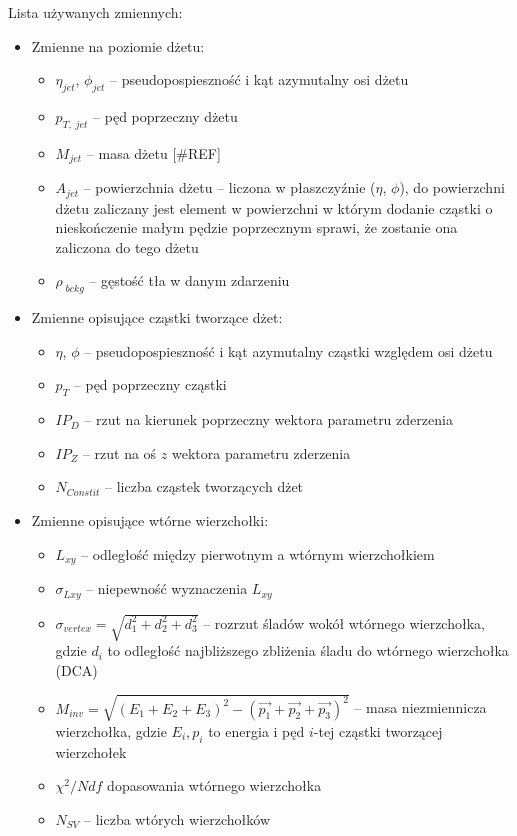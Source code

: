 Lista używanych zmiennych:
\begin{itemize}
	\item Zmienne na poziomie dżetu:
	\begin{itemize}	
		\item $\eta_{jet}$, $\phi_{jet}$ -- pseudopospieszność i kąt azymutalny osi dżetu
		\item $p_{T,\;jet}$ -- pęd poprzeczny dżetu
		\item $M_{jet}$ -- masa dżetu [\#REF]
		\item $A_{jet}$ -- powierzchnia dżetu -- liczona w płaszczyźnie ($\eta$, $\phi$),   do powierzchni dżetu zaliczany jest element w powierzchni w którym dodanie cząstki o nieskończenie małym pędzie poprzecznym sprawi, że zostanie ona zaliczona do tego dżetu \cite{Cacciari:2007fd}
		\item $\rho_{\;bckg}$ -- gęstość tła w danym zdarzeniu
	\end{itemize}
	
	\item Zmienne opisujące cząstki tworzące dżet:
	\begin{itemize}	
		\item $\eta$, $\phi$ -- pseudopospieszność i kąt azymutalny cząstki względem osi dżetu
		\item $p_T$ -- pęd poprzeczny cząstki
		\item $IP_D$ -- rzut na kierunek poprzeczny wektora parametru zderzenia
		\item $IP_Z$ -- rzut na oś $z$ wektora parametru zderzenia
		\item $N_{Constit}$ -- liczba cząstek tworzących dżet
	\end{itemize}	
	
	
	\item Zmienne opisujące wtórne wierzchołki:
	\begin{itemize}	
		\item $L_{xy}$ -- odległość między pierwotnym a wtórnym wierzchołkiem 
		\item $\sigma_{Lxy}$ -- niepewność wyznaczenia $L_{xy}$
		\item $\sigma_{vertex} = \sqrt{d_1^2 + d_2^2 + d_3^2}$ -- rozrzut śladów  wokół wtórnego wierzchołka, gdzie $d_i$ to odległość najbliższego zbliżenia śladu do wtórnego wierzchołka (DCA) %
		\item $M_{inv} = \sqrt{(E_1 + E_2 + E_3)^2 - (\vec{p_1} + \vec{p_2} + \vec{p_3})^2}$ -- masa niezmiennicza wierzchołka, gdzie $E_i, p_i$ to energia i pęd $i$-tej cząstki tworzącej wierzchołek
		\item $\chi^2/Ndf$  dopasowania wtórnego wierzchołka
		\item $N_{SV}$ -- liczba wtórych wierzchołków

	\end{itemize}
\end{itemize}


